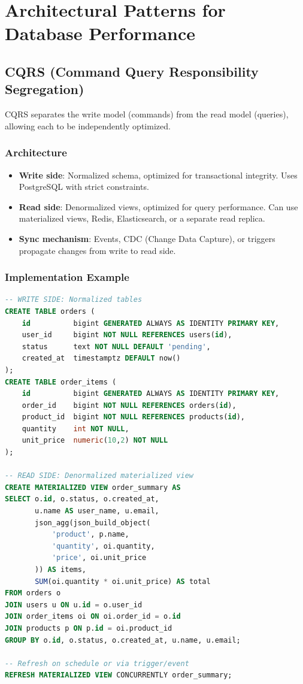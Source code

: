 \documentclass[12pt,a4paper]{article}
\begin{document}
\section{Architectural Patterns for Database Performance}

\subsection{CQRS (Command Query Responsibility Segregation)}

CQRS separates the write model (commands) from the read model (queries), allowing each to be independently optimized.

\subsubsection{Architecture}

\begin{itemize}
    \item \textbf{Write side}: Normalized schema, optimized for transactional integrity. Uses PostgreSQL with strict constraints.
    \item \textbf{Read side}: Denormalized views, optimized for query performance. Can use materialized views, Redis, Elasticsearch, or a separate read replica.
    \item \textbf{Sync mechanism}: Events, CDC (Change Data Capture), or triggers propagate changes from write to read side.
\end{itemize}

\subsubsection{Implementation Example}

\begin{lstlisting}[language=SQL, caption={CQRS with PostgreSQL}]
-- WRITE SIDE: Normalized tables
CREATE TABLE orders (
    id          bigint GENERATED ALWAYS AS IDENTITY PRIMARY KEY,
    user_id     bigint NOT NULL REFERENCES users(id),
    status      text NOT NULL DEFAULT 'pending',
    created_at  timestamptz DEFAULT now()
);
CREATE TABLE order_items (
    id          bigint GENERATED ALWAYS AS IDENTITY PRIMARY KEY,
    order_id    bigint NOT NULL REFERENCES orders(id),
    product_id  bigint NOT NULL REFERENCES products(id),
    quantity    int NOT NULL,
    unit_price  numeric(10,2) NOT NULL
);

-- READ SIDE: Denormalized materialized view
CREATE MATERIALIZED VIEW order_summary AS
SELECT o.id, o.status, o.created_at,
       u.name AS user_name, u.email,
       json_agg(json_build_object(
           'product', p.name,
           'quantity', oi.quantity,
           'price', oi.unit_price
       )) AS items,
       SUM(oi.quantity * oi.unit_price) AS total
FROM orders o
JOIN users u ON u.id = o.user_id
JOIN order_items oi ON oi.order_id = o.id
JOIN products p ON p.id = oi.product_id
GROUP BY o.id, o.status, o.created_at, u.name, u.email;

-- Refresh on schedule or via trigger/event
REFRESH MATERIALIZED VIEW CONCURRENTLY order_summary;
\end{lstlisting}
\end{document}
